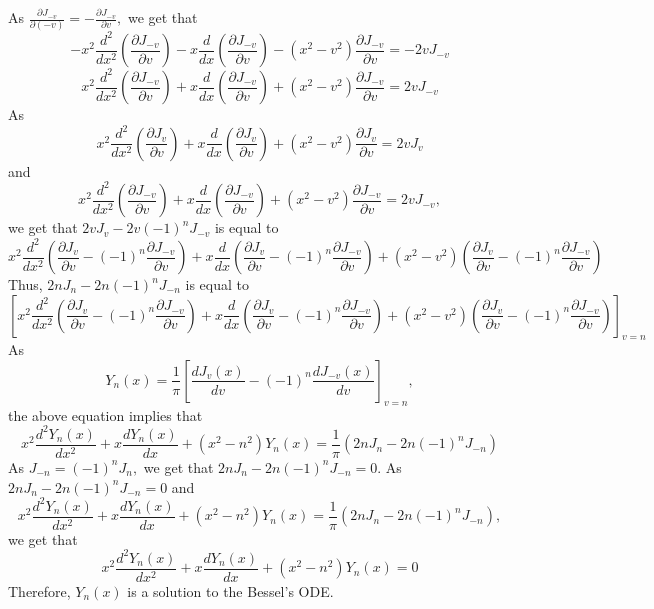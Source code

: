As $\frac{\partial J_{-v}}{\partial(-v)}=-\frac{\partial J_{-v}}{\partial v},$ we get that 
$$-x^{2} \frac{d^{2}}{d x^{2}}\left(\frac{\partial J_{-v}}{\partial v}\right)-x \frac{d}{d x}\left(\frac{\partial J_{-v}}{\partial v}\right)-\left(x^{2}-v^{2}\right) \frac{\partial J_{-v}}{\partial v}=-2 v J_{-v}$$
$$x^{2} \frac{d^{2}}{d x^{2}}\left(\frac{\partial J_{-v}}{\partial v}\right)+x \frac{d}{d x}\left(\frac{\partial J_{-v}}{\partial v}\right)+\left(x^{2}-v^{2}\right) \frac{\partial J_{-v}}{\partial v}=2 v J_{-v}$$
As 
$$x^{2} \frac{d^{2}}{d x^{2}}\left(\frac{\partial J_{v}}{\partial v}\right)+x \frac{d}{d x}\left(\frac{\partial J_{v}}{\partial v}\right)+\left(x^{2}-v^{2}\right) \frac{\partial J_{v}}{\partial v}=2 v J_{v}$$ 
and
$$x^{2} \frac{d^{2}}{d x^{2}}\left(\frac{\partial J_{-v}}{\partial v}\right)+x \frac{d}{d x}\left(\frac{\partial J_{-v}}{\partial v}\right)+\left(x^{2}-v^{2}\right) \frac{\partial J_{-v}}{\partial v}=2 v J_{-v},$$ 
we get that $2 v J_{v}-2 v(-1)^{n} J_{-v}$ is equal to 
$$x^{2} \frac{d^{2}}{d x^{2}}\left(\frac{\partial J_{v}}{\partial v}-(-1)^{n} \frac{\partial J_{-v}}{\partial v}\right)+x \frac{d}{d x}\left(\frac{\partial J_{v}}{\partial v}-(-1)^{n} \frac{\partial J_{-v}}{\partial v}\right)+\left(x^{2}-v^{2}\right)\left(\frac{\partial J_{v}}{\partial v}-(-1)^{n} \frac{\partial J_{-v}}{\partial v}\right)$$
Thus, $2 n J_{n}-2 n(-1)^{n} J_{-n}$ is equal to
$$\left[x^{2} \frac{d^{2}}{d x^{2}}\left(\frac{\partial J_{v}}{\partial v}-(-1)^{n} \frac{\partial J_{-v}}{\partial v}\right)+x \frac{d}{d x}\left(\frac{\partial J_{v}}{\partial v}-(-1)^{n} \frac{\partial J_{-v}}{\partial v}\right)+\left(x^{2}-v^{2}\right)\left(\frac{\partial J_{v}}{\partial v}-(-1)^{n} \frac{\partial J_{-v}}{\partial v}\right)\right]_{v=n}$$
As 
$$Y_{n}(x)=\frac{1}{\pi}\left[\frac{d J_{v}(x)}{d v}-(-1)^{n} \frac{d J_{-v}(x)}{d v}\right]_{v=n},$$
the above equation implies that
$$x^{2} \frac{d^{2} Y_{n}(x)}{d x^{2}}+x \frac{d Y_{n}(x)}{d x}+\left(x^{2}-n^{2}\right) Y_{n}(x)=\frac{1}{\pi}\left(2 n J_{n}-2 n(-1)^{n} J_{-n}\right)$$
As $J_{-n}=(-1)^{n} J_{n},$ we get that $2 n J_{n}-2 n(-1)^{n} J_{-n}=0$. As $2 n J_{n}-2 n(-1)^{n} J_{-n}=0$ and
$$x^{2} \frac{d^{2} Y_{n}(x)}{d x^{2}}+x \frac{d Y_{n}(x)}{d x}+\left(x^{2}-n^{2}\right) Y_{n}(x)=\frac{1}{\pi}\left(2 n J_{n}-2 n(-1)^{n} J_{-n}\right),$$ 
we get that
$$x^{2} \frac{d^{2} Y_{n}(x)}{d x^{2}}+x \frac{d Y_{n}(x)}{d x}+\left(x^{2}-n^{2}\right) Y_{n}(x)=0$$
Therefore, $Y_{n}(x)$ is a solution to the Bessel's ODE.










